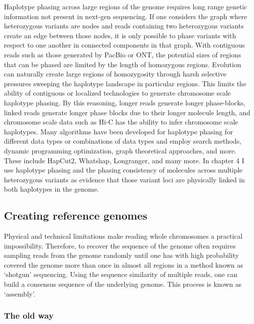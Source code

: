 \par{
Haplotype phasing across large regions of the genome requires long range genetic information not present in next-gen sequencing. If one considers the graph where heterozygous variants are nodes and reads containing two heterozygous variants create an edge between those nodes, it is only possible to phase variants with respect to one another in connected components in that graph. With contiguous reads such as those generated by PacBio or ONT, the potential sizes of regions that can be phased are limited by the length of homozygous regions. Evolution can naturally create large regions of homozygosity through harsh selective pressures sweeping the haplotype landscape in particular regions\cite{homozygosity}. This limits the ability of contiguous or localized technologies to generate chromosome scale haplotype phasing. By this reasoning, longer reads generate longer phase-blocks, linked reads generate longer phase blocks due to their longer molecule length, and chromosome scale data such as Hi-C has the ability to infer chromosome scale haplotypes\cite{falconphase}. Many algorithms have been developed for haplotype phasing for different data types or combinations of data types and employ search methods, dynamic programming optimization, graph theoretical approaches, and more. These include HapCut2\cite{hapcut2}, Whatshap\cite{whatshap}, Longranger\cite{10xlinked}, and many more. In chapter 4 I use haplotype phasing and the phasing consistency of molecules across multiple heterozygous variants as evidence that those variant loci are physically linked in both haplotypes in the genome.
}

\subsection{Creating reference genomes}

\par{
Physical and technical limitations make reading whole chromosomes a practical impossibility. Therefore, to recover the sequence of the genome often requires sampling reads from the genome randomly until one has with high probability covered the genome more than once in almost all regions\cite{LanderWaterman} in a method known as `shotgun' sequencing. Using the sequence similarity of multiple reads, one can build a consensus sequence of the underlying genome. This process is known as `assembly'.
} 

\subsubsection{The old way}

